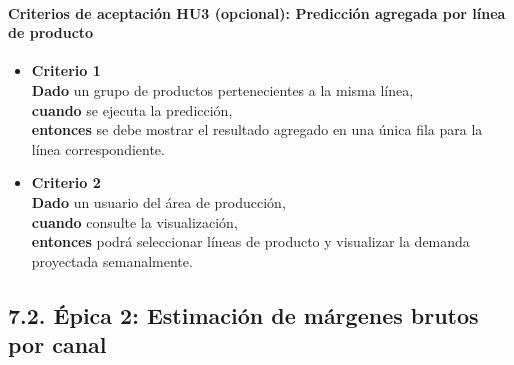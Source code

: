 \documentclass[
11pt, %
]{charter}
\begin{document}
\vspace{1em}

\paragraph{Criterios de aceptación HU3 (opcional): Predicción agregada por línea de producto}
\begin{itemize}
  \item \textbf{Criterio 1} \\
  \textbf{Dado} un grupo de productos pertenecientes a la misma línea, \\
  \textbf{cuando} se ejecuta la predicción, \\
  \textbf{entonces} se debe mostrar el resultado agregado en una única fila para la línea correspondiente.

  \item \textbf{Criterio 2} \\
  \textbf{Dado} un usuario del área de producción, \\
  \textbf{cuando} consulte la visualización, \\
  \textbf{entonces} podrá seleccionar líneas de producto y visualizar la demanda proyectada semanalmente.
\end{itemize}

\subsection*{7.2. Épica 2: Estimación de márgenes brutos por canal}
\end{document}
